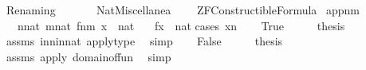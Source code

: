 %
\begin{isabellebody}%
%
%
\isadelimdocument
%
\endisadelimdocument
%
\isatagdocument
%
\isamarkuptrue%
%
\endisatagdocument
{\isafolddocument}%
%
\isadelimdocument
%
\endisadelimdocument
%
\isadelimtheory
%
\endisadelimtheory
%
\isatagtheory
{}\isamarkupfalse%
\ Renaming\isanewline
\ \ \isanewline
\ \ \ \ Nat{\isacharunderscore}{\kern0pt}Miscellanea\isanewline
\ \ \ \ {\isachardoublequoteopen}ZF{\isacharminus}{\kern0pt}Constructible{\isachardot}{\kern0pt}Formula{\isachardoublequoteclose}\isanewline
{}%
\endisatagtheory
{\isafoldtheory}%
%
\isadelimtheory
\isanewline
%
\endisadelimtheory
\isanewline
{}\isamarkupfalse%
\ app{\isacharunderscore}{\kern0pt}nm\ {\isacharcolon}{\kern0pt}\isanewline
\ \ \ {\isachardoublequoteopen}n{\isasymin}nat{\isachardoublequoteclose}\ {\isachardoublequoteopen}m{\isasymin}nat{\isachardoublequoteclose}\ {\isachardoublequoteopen}f{\isasymin}n{\isasymrightarrow}m{\isachardoublequoteclose}\ {\isachardoublequoteopen}x\ {\isasymin}\ nat{\isachardoublequoteclose}\isanewline
\ \ \ {\isachardoublequoteopen}f{\isacharbackquote}{\kern0pt}x\ {\isasymin}\ nat{\isachardoublequoteclose}\isanewline
%
\isadelimproof
%
\endisadelimproof
%
\isatagproof
{}\isamarkupfalse%
{\isacharparenleft}{\kern0pt}cases\ {\isachardoublequoteopen}x{\isasymin}n{\isachardoublequoteclose}{\isacharparenright}{\kern0pt}\isanewline
\ \ \isamarkupfalse%
\ True\isanewline
\ \ \isamarkupfalse%
\ \isamarkupfalse%
\ {\isacharquery}{\kern0pt}thesis\ \isamarkupfalse%
\ assms\ in{\isacharunderscore}{\kern0pt}n{\isacharunderscore}{\kern0pt}in{\isacharunderscore}{\kern0pt}nat\ apply{\isacharunderscore}{\kern0pt}type\ \isamarkupfalse%
\ simp\isanewline
{}\isamarkupfalse%
\isanewline
\ \ \isamarkupfalse%
\ False\isanewline
\ \ \isamarkupfalse%
\ \isamarkupfalse%
\ {\isacharquery}{\kern0pt}thesis\ \isamarkupfalse%
\ assms\ apply{\isacharunderscore}{\kern0pt}{}\ domain{\isacharunderscore}{\kern0pt}of{\isacharunderscore}{\kern0pt}fun\ \isamarkupfalse%
\ simp\isanewline
{}\isamarkupfalse%
%
\endisatagproof
{\isafoldproof}%
%
\isadelimproof
%
\endisadelimproof
%
\isadelimdocument
%
\endisadelimdocument
%
\isatagdocument

\end{isabellebody}

